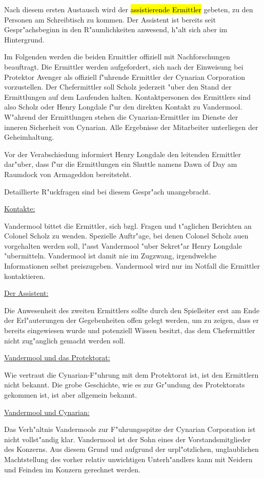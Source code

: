 Nach diesem ersten Austausch wird der \hl{assistierende Ermittler} gebeten, zu den Personen am Schreibtisch zu kommen. Der Assistent ist bereits seit Gespr"achsbeginn in den R"aumlichkeiten anwesend, h"alt sich aber im Hintergrund.

Im Folgenden werden die beiden Ermittler offiziell mit Nachforschungen beauftragt. Die Ermittler werden aufgefordert, sich nach der Einweisung bei Protektor Avenger als offiziell f"uhrende Ermittler der Cynarian Corporation vorzustellen. Der Chefermittler soll Scholz jederzeit "uber den Stand der Ermittlungen auf dem Laufenden halten. Kontaktpersonen des Ermittlers sind also Scholz oder Henry Longdale f"ur den direkten Kontakt zu Vandermool. W"ahrend der Ermittlungen stehen die Cynarian-Ermittler im Dienste der inneren Sicherheit von Cynarian. Alle Ergebnisse der Mitarbeiter unterliegen der Geheimhaltung.

Vor der Verabschiedung informiert Henry Longdale den leitenden Ermittler dar"uber, dass f"ur die Ermittlungen ein Shuttle namens Dawn of Day am Raumdock von Armageddon bereitsteht.


\begin{remarks}	
	Detaillierte R"uckfragen sind bei diesem Gespr"ach unangebracht. 
	
	\underline{Kontakte:}

	Vandermool bittet die Ermittler, sich bzgl. Fragen und t"aglichen Berichten an Colonel Scholz zu wenden. Spezielle Auftr"age, bei denen Colonel Scholz au\3en vorgehalten werden soll, l"asst Vandermool "uber Sekret"ar Henry Longdale "ubermitteln. Vandermool ist damit nie im Zugzwang, irgendwelche Informationen selbst preiszugeben. Vandermool wird nur im Notfall die Ermittler kontaktieren.

	\underline{Der Assistent:}

	Die Anwesenheit des zweiten Ermittlers sollte durch den Spielleiter erst am Ende der Erl"auterungen der Gegebenheiten offen gelegt werden, um zu zeigen, dass er bereits eingewiesen wurde und potenziell Wissen besitzt, das dem Chefermittler nicht zug"anglich gemacht werden soll.

	\underline{Vandermool und das Protektorat:}

	Wie vertraut die Cynarian-F"uhrung mit dem Protektorat ist, ist den Ermittlern nicht bekannt. Die grobe Geschichte, wie es zur Gr"undung des Protektorats gekommen ist, ist aber allgemein bekannt.

	\underline{Vandermool und Cynarian:}

	Das Verh"altnis Vandermools zur F"uhrungsspitze der Cynarian Corporation ist nicht vollst"andig klar. Vandermool ist der Sohn eines der Vorstandsmitglieder des Konzerns. Aus diesem Grund und aufgrund der urpl"otzlichen, unglaublichen Machtstellung des vorher relativ unwichtigen Unterh"andlers kann mit Neidern und Feinden im Konzern gerechnet werden.
\end{remarks}

